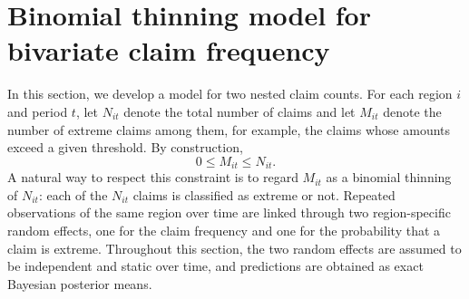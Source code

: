 \section{Binomial thinning model for bivariate claim frequency}
\label{sec.thin}

In this section, we develop a model for two nested claim counts.
For each region \(i\) and period \(t\), let \(N_{it}\) denote the total
number of claims and let \(M_{it}\) denote the number of extreme claims
among them, for example, the claims whose amounts exceed a given
threshold. By construction,
\[
0\le M_{it}\le N_{it}.
\]
A natural way to respect this constraint is to regard \(M_{it}\) as a
binomial thinning of \(N_{it}\): each of the \(N_{it}\) claims is
classified as extreme or not. Repeated observations of the same region
over time are linked through two region-specific random effects, one
for the claim frequency and one for the probability that a claim is
extreme. Throughout this section, the two random effects are assumed to
be independent and static over time, and predictions are obtained as
exact Bayesian posterior means.

